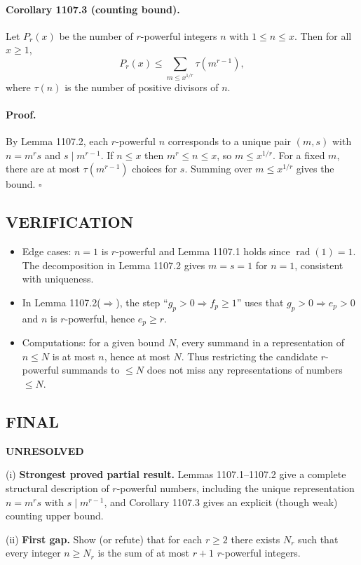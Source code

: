 \paragraph{Corollary 1107.3 (counting bound).}
Let $P_r(x)$ be the number of $r$-powerful integers $n$ with $1\le n\le x$. Then for all $x\ge 1$,
\[P_r(x)\le \sum_{m\le x^{1/r}} \tau\!\left(m^{r-1}\right),\]
where $\tau(n)$ is the number of positive divisors of $n$.

\paragraph{Proof.}
By Lemma 1107.2, each $r$-powerful $n$ corresponds to a unique pair $(m,s)$ with $n=m^r s$ and $s\mid m^{r-1}$.
If $n\le x$ then $m^r\le n\le x$, so $m\le x^{1/r}$.
For a fixed $m$, there are at most $\tau(m^{r-1})$ choices for $s$. Summing over $m\le x^{1/r}$ gives the bound. \hfill $\square$

\subsection*{VERIFICATION}
\begin{itemize}
\item Edge cases: $n=1$ is $r$-powerful and Lemma 1107.1 holds since $\operatorname{rad}(1)=1$.
The decomposition in Lemma 1107.2 gives $m=s=1$ for $n=1$, consistent with uniqueness.
\item In Lemma 1107.2($\Rightarrow$), the step ``$g_p>0\Rightarrow f_p\ge 1$'' uses that $g_p>0\Rightarrow e_p>0$ and $n$ is $r$-powerful, hence $e_p\ge r$.
\item Computations: for a given bound $N$, every summand in a representation of $n\le N$ is at most $n$, hence at most $N$. Thus restricting the candidate $r$-powerful summands to $\le N$ does not miss any representations of numbers $\le N$.
\end{itemize}

\subsection*{FINAL}
\textbf{UNRESOLVED}

(i) \textbf{Strongest proved partial result.}
Lemmas 1107.1--1107.2 give a complete structural description of $r$-powerful numbers, including the unique representation $n=m^r s$ with $s\mid m^{r-1}$, and Corollary 1107.3 gives an explicit (though weak) counting upper bound.

(ii) \textbf{First gap.}
Show (or refute) that for each $r\ge 2$ there exists $N_r$ such that every integer $n\ge N_r$ is the sum of at most $r+1$ $r$-powerful integers.

